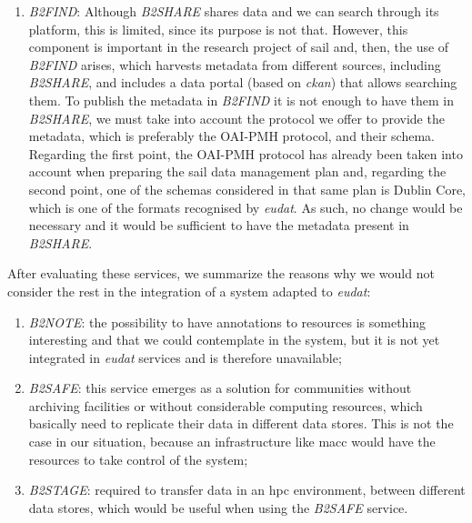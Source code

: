 \begin{enumerate}
    \item \textit{B2FIND}: Although \textit{B2SHARE} shares data and we can search through its platform, this is limited, since its purpose is not that. However, this component is important in the research project of \gls{sail} and, then, the use of \textit{B2FIND} arises, which harvests metadata from different sources, including \textit{B2SHARE}, and includes a data portal (based on \textit{\gls{ckan}}) that allows searching them. To publish the metadata in \textit{B2FIND} it is not enough to have them in \textit{B2SHARE}, we must take into account the protocol we offer to provide the metadata, which is preferably the OAI-PMH protocol, and their schema. Regarding the first point, the OAI-PMH protocol has already been taken into account when preparing the \gls{sail} data management plan and, regarding the second point, one of the schemas considered in that same plan is Dublin Core, which is one of the formats recognised by \textit{\gls{eudat}}. As such, no change would be necessary and it would be sufficient to have the metadata present in \textit{B2SHARE}. 
\end{enumerate}

After evaluating these services, we summarize the reasons why we would not consider the rest in the integration of a system adapted to \textit{\gls{eudat}}:

\begin{enumerate}
    \item \textit{B2NOTE}: the possibility to have annotations to resources is something interesting and that we could contemplate in the system, but it is not yet integrated in \textit{\gls{eudat}} services and is therefore unavailable;
    \item \textit{B2SAFE}: this service emerges as a solution for communities without archiving facilities or without considerable computing resources, which basically need to replicate their data in different data stores. This is not the case in our situation, because an infrastructure like \gls{macc} would have the resources to take control of the system;
    \item \textit{B2STAGE}: required to transfer data in an \gls{hpc} environment, between different data stores, which would be useful when using the \textit{B2SAFE} service.
\end{enumerate}
  